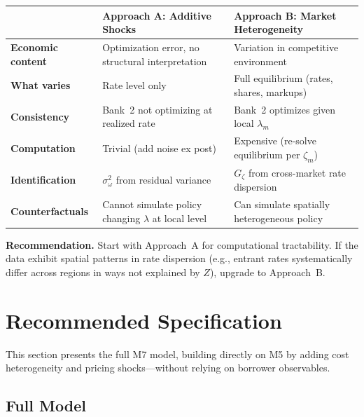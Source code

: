 \documentclass[12pt]{article}
\theoremstyle{plain}
\theoremstyle{plain}
\theoremstyle{definition}  %
\theoremstyle{remark}  %
\begin{document}
\begin{center}
\renewcommand{\arraystretch}{1.4}
\begin{tabular}{p{3.5cm}p{5cm}p{5cm}}
\toprule
& \textbf{Approach A: Additive Shocks} & \textbf{Approach B: Market Heterogeneity} \\
\midrule
\textbf{Economic content} & Optimization error, no structural interpretation & Variation in competitive environment \\
\textbf{What varies} & Rate level only & Full equilibrium (rates, shares, markups) \\
\textbf{Consistency} & Bank~2 not optimizing at realized rate & Bank~2 optimizes given local $\lambda_m$ \\
\textbf{Computation} & Trivial (add noise ex post) & Expensive (re-solve equilibrium per $\zeta_m$) \\
\textbf{Identification} & $\sigma_\omega^2$ from residual variance & $G_\zeta$ from cross-market rate dispersion \\
\textbf{Counterfactuals} & Cannot simulate policy changing $\lambda$ at local level & Can simulate spatially heterogeneous policy \\
\bottomrule
\end{tabular}
\end{center}

\medskip\noindent
\textbf{Recommendation.} Start with Approach~A for computational tractability. If the data exhibit spatial patterns in rate dispersion (e.g., entrant rates systematically differ across regions in ways not explained by $Z$), upgrade to Approach~B.



\section{Recommended Specification}\label{sec:combined}

This section presents the full M7 model, building directly on M5 by adding cost heterogeneity and pricing shocks---without relying on borrower observables.

\subsection{Full Model}
\end{document}

